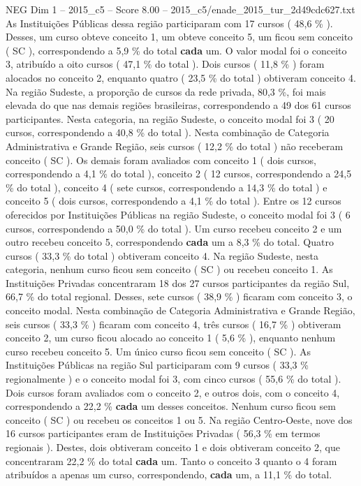 \begin{textsample}{NEG Dim 1 – 2015\_c5 – Score 8.00 – 2015\_c5/enade\_2015\_tur\_2d49cdc627.txt}
As Instituições Públicas dessa região participaram com 17 cursos ( 48,6 \% ).
Desses, um curso obteve conceito 1, um obteve conceito 5, um ficou sem conceito ( SC ), correspondendo a 5,9 \% do total \textbf{cada} um.
O valor modal foi o conceito 3, atribuído a oito cursos ( 47,1 \% do total ).
Dois cursos ( 11,8 \% ) foram alocados no conceito 2, enquanto quatro ( 23,5 \% do total ) obtiveram conceito 4.
Na região Sudeste, a proporção de cursos da rede privada, 80,3 \%, foi mais elevada do que nas demais regiões brasileiras, correspondendo a 49 dos 61 cursos participantes.
Nesta categoria, na região Sudeste, o conceito modal foi 3 ( 20 cursos, correspondendo a 40,8 \% do total ).
Nesta combinação de Categoria Administrativa e Grande Região, seis cursos ( 12,2 \% do total ) não receberam conceito ( SC ).
Os demais foram avaliados com conceito 1 ( dois cursos, correspondendo a 4,1 \% do total ), conceito 2 ( 12 cursos, correspondendo a 24,5 \% do total ), conceito 4 ( sete cursos, correspondendo a 14,3 \% do total ) e conceito 5 ( dois cursos, correspondendo a 4,1 \% do total ).
Entre os 12 cursos oferecidos por Instituições Públicas na região Sudeste, o conceito modal foi 3 ( 6 cursos, correspondendo a 50,0 \% do total ).
Um curso recebeu conceito 2 e um outro recebeu conceito 5, correspondendo \textbf{cada} um a 8,3 \% do total.
Quatro cursos ( 33,3 \% do total ) obtiveram conceito 4.
Na região Sudeste, nesta categoria, nenhum curso ficou sem conceito ( SC ) ou recebeu conceito 1.
As Instituições Privadas concentraram 18 dos 27 cursos participantes da região Sul, 66,7 \% do total regional.
Desses, sete cursos ( 38,9 \% ) ficaram com conceito 3, o conceito modal.
Nesta combinação de Categoria Administrativa e Grande Região, seis cursos ( 33,3 \% ) ficaram com conceito 4, três cursos ( 16,7 \% ) obtiveram conceito 2, um curso ficou alocado ao conceito 1 ( 5,6 \% ), enquanto nenhum curso recebeu conceito 5.
Um único curso ficou sem conceito ( SC ).
As Instituições Públicas na região Sul participaram com 9 cursos ( 33,3 \% regionalmente ) e o conceito modal foi 3, com cinco cursos ( 55,6 \% do total ).
Dois cursos foram avaliados com o conceito 2, e outros dois, com o conceito 4, correspondendo a 22,2 \% \textbf{cada} um desses conceitos.
Nenhum curso ficou sem conceito ( SC ) ou recebeu os conceitos 1 ou 5.
Na região Centro-Oeste, nove dos 16 cursos participantes eram de Instituições Privadas ( 56,3 \% em termos regionais ).
Destes, dois obtiveram conceito 1 e dois obtiveram conceito 2, que concentraram 22,2 \% do total \textbf{cada} um.
Tanto o conceito 3 quanto o 4 foram atribuídos a apenas um curso, correspondendo, \textbf{cada} um, a 11,1 \% do total.

\end{textsample}
